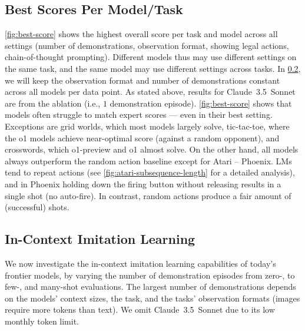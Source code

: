 \documentclass{article}
\newcommand{\ie}{i.e., }
\newcommand{\claude}{Claude~3.5~Sonnet}
\newcommand{\preview}{o1-preview}
\newcommand{\oone}{o1}
\begin{document}
\subsection{Best Scores Per Model/Task}
\label{sec:results:best-scores}
\cref{fig:best-score} shows the highest overall score per task and model across all settings (number of demonstrations, observation format, showing legal actions, chain-of-thought prompting).
Different models thus may use different settings on the same task, and the same model may use different settings across tasks.
In \cref{sec:results:in-context-imitation-learning}, we will keep the observation format and number of demonstrations constant across all models per data point.
As stated above, results for \claude{} are from the ablation (\ie $1$ demonstration episode).
\cref{fig:best-score} shows that models often struggle to match expert scores --- even in their best setting.
Exceptions are grid worlds, which most models largely solve, tic-tac-toe, where the o1 models achieve near-optimal score (against a random opponent), and crosswords, which \preview{} and \oone{} almost solve.
On the other hand, all models always outperform the random action baseline except for Atari -- Phoenix.
LMs tend to repeat actions (see \cref{fig:atari-subsequence-length} for a detailed analysis), and in Phoenix holding down the firing button without releasing results in a single shot (no auto-fire).
In contrast, random actions produce a fair amount of (successful) shots.
\subsection{In-Context Imitation Learning}
\label{sec:results:in-context-imitation-learning}
We now investigate the in-context imitation learning capabilities of today's frontier models, by varying the number of demonstration episodes from zero-, to few-, and many-shot evaluations.
The largest number of demonstrations depends on the models' context sizes, the task, and the tasks' observation formats (images require more tokens than text).
We omit \claude{} due to its low monthly token limit.
\end{document}

